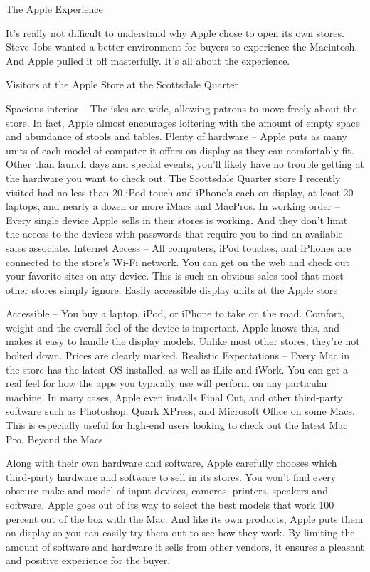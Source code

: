 ﻿\documentclass[12pt,a4paper,onecolumn]{article}
\begin{document}
The Apple Experience

It's really not difficult to understand why Apple chose to open its own stores. Steve Jobs wanted a
better environment for buyers to experience the Macintosh. And Apple pulled it off masterfully. It's
all about the experience.

Visitors at the Apple Store at the Scottsdale Quarter

Spacious interior – The isles are wide, allowing patrons to move freely about the store. In fact,
Apple almost encourages loitering with the amount of empty space and abundance of stools and tables.
Plenty of hardware – Apple puts as many units of each model of computer it offers on display as they
can comfortably fit. Other than launch days and special events, you'll likely have no trouble
getting at the hardware you want to check out. The Scottsdale Quarter store I recently visited had
no less than 20 iPod touch and iPhone's each on display, at least 20 laptops, and nearly a dozen or
more iMacs and MacPros. In working order – Every single device Apple sells in their stores is
working. And they don't limit the access to the devices with passwords that require you to find an
available sales associate. Internet Access – All computers, iPod touches, and iPhones are connected
to the store's Wi-Fi network. You can get on the web and check out your favorite sites on any
device. This is such an obvious sales tool that most other stores simply ignore. Easily accessible
display units at the Apple store

Accessible – You buy a laptop, iPod, or iPhone to take on the road. Comfort, weight and the overall
feel of the device is important. Apple knows this, and makes it easy to handle the display models.
Unlike most other stores, they're not bolted down. Prices are clearly marked. Realistic Expectations
– Every Mac in the store has the latest OS installed, as well as iLife and iWork. You can get a real
feel for how the apps you typically use will perform on any particular machine. In many cases, Apple
even installs Final Cut, and other third-party software such as Photoshop, Quark XPress, and
Microsoft Office on some Macs. This is especially useful for high-end users looking to check out the
latest Mac Pro. Beyond the Macs

Along with their own hardware and software, Apple carefully chooses which third-party hardware and
software to sell in its stores. You won't find every obscure make and model of input devices,
cameras, printers, speakers and software. Apple goes out of its way to select the best models that
work 100 percent out of the box with the Mac. And like its own products, Apple puts them on display
so you can easily try them out to see how they work. By limiting the amount of software and hardware
it sells from other vendors, it ensures a pleasant and positive experience for the buyer.
\end{document}
